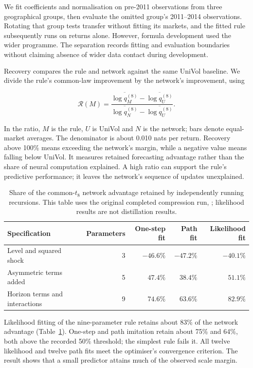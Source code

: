 We fit coefficients and normalisation on pre-2011 observations from three geographical groups, then evaluate the omitted group's 2011--2014 observations. Rotating that group tests transfer without fitting its markets, and the fitted rule subsequently runs on returns alone. However, formula development used the wider programme. The separation records fitting and evaluation boundaries without claiming absence of wider data contact during development.

Recovery compares the rule and network against the same UniVol baseline. We divide the rule's common-law improvement by the network's improvement, using

\begin{equation}
 \mathcal{R}(M)=
 \frac{\overline{\log q_M^{(8)}}-\overline{\log q_U^{(8)}}}
 {\overline{\log q_N^{(8)}}-\overline{\log q_U^{(8)}}}.
 \label{eq:recovery-fraction}
\end{equation}

In the ratio, $M$ is the rule, $U$ is UniVol and $N$ is the network; bars denote equal-market averages. The denominator is about 0.010 nats per return. Recovery above 100\% means exceeding the network's margin, while a negative value means falling below UniVol. It measures retained forecasting advantage rather than the share of neural computation explained. A high ratio can support the rule's predictive performance; it leaves the network's sequence of updates unexplained.

\begin{table}[!htbp]
\centering
\caption[Forecasting performance retained by explicit recursions]{Share of the common-$t_8$ network advantage retained by independently running recursions. This table uses the original completed compression run, ; likelihood results are not distillation results.}
\label{tab:compression-results}
\small
\begin{tabular}{lrrrr}
\toprule
Specification & Parameters & One-step fit & Path fit & Likelihood fit \\
\midrule
Level and squared shock & 3 & $-46.6\%$ & $-47.2\%$ & $-40.1\%$ \\
Asymmetric terms added & 5 & $47.4\%$ & $38.4\%$ & $51.1\%$ \\
Horizon terms and interactions & 9 & $74.6\%$ & $63.6\%$ & $82.9\%$ \\
\bottomrule
\end{tabular}
\end{table}

Likelihood fitting of the nine-parameter rule retains about 83\% of the network advantage (Table~\ref{tab:compression-results}). One-step and path imitation retain about 75\% and 64\%, both above the recorded 50\% threshold; the simplest rule fails it. All twelve likelihood and twelve path fits meet the optimiser's convergence criterion. The result shows that a small predictor attains much of the observed scale margin.

